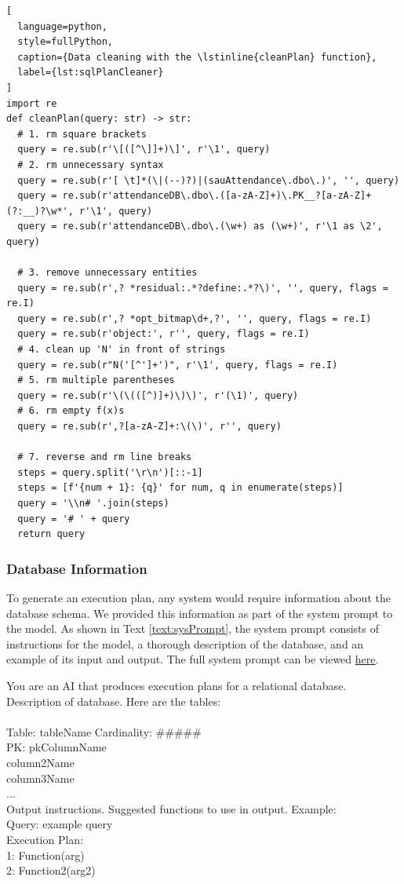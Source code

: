 \begin{lstlisting}[
  language=python,
  style=fullPython,
  caption={Data cleaning with the \lstinline{cleanPlan} function},
  label={lst:sqlPlanCleaner}
]
import re
def cleanPlan(query: str) -> str:
  # 1. rm square brackets
  query = re.sub(r'\[([^\]]+)\]', r'\1', query)
  # 2. rm unnecessary syntax
  query = re.sub(r'[ \t]*(\|(--)?)|(sauAttendance\.dbo\.)', '', query)
  query = re.sub(r'attendanceDB\.dbo\.([a-zA-Z]+)\.PK__?[a-zA-Z]+(?:__)?\w*', r'\1', query)
  query = re.sub(r'attendanceDB\.dbo\.(\w+) as (\w+)', r'\1 as \2', query)

  # 3. remove unnecessary entities
  query = re.sub(r',? *residual:.*?define:.*?\)', '', query, flags = re.I)
  query = re.sub(r',? *opt_bitmap\d+,?', '', query, flags = re.I)
  query = re.sub(r'object:', r'', query, flags = re.I)
  # 4. clean up 'N' in front of strings
  query = re.sub(r"N('[^']+')", r'\1', query, flags = re.I)
  # 5. rm multiple parentheses
  query = re.sub(r'\(\(([^)]+)\)\)', r'(\1)', query)
  # 6. rm empty f(x)s
  query = re.sub(r',?[a-zA-Z]+:\(\)', r'', query)
  
  # 7. reverse and rm line breaks
  steps = query.split('\r\n')[::-1]
  steps = [f'{num + 1}: {q}' for num, q in enumerate(steps)]
  query = '\\n# '.join(steps)
  query = '# ' + query
  return query
\end{lstlisting}

\subsubsection{Database Information}
To generate an execution plan, any system would require information about the database schema. We provided this information as part of the system prompt to the model. As shown in Text \ref{text:sysPrompt}, the system prompt consists of instructions for the model, a thorough description of the database, and an example of its input and output. The full system prompt can be viewed \href{https://github.com/MatousAc/llamaExecPlan/blob/main/src/sysPrompt.txt}{here}.

\begin{text}
  You are an AI that produces execution plans for a relational database. Description of database. Here are the tables:\\
  \\
  Table: tableName Cardinality: \#\#\#\#\#\\
  PK: pkColumnName\\
  column2Name\\
  column3Name\\
  ...\\
  Output instructions. Suggested functions to use in output. Example:\\
  Query: example query\\
  Execution Plan:\\
  1: Function(arg)\\
  2: Function2(arg2)
  \caption{The structure of the system prompt provided to the model.}
  \label{text:sysPrompt}
\end{text}

